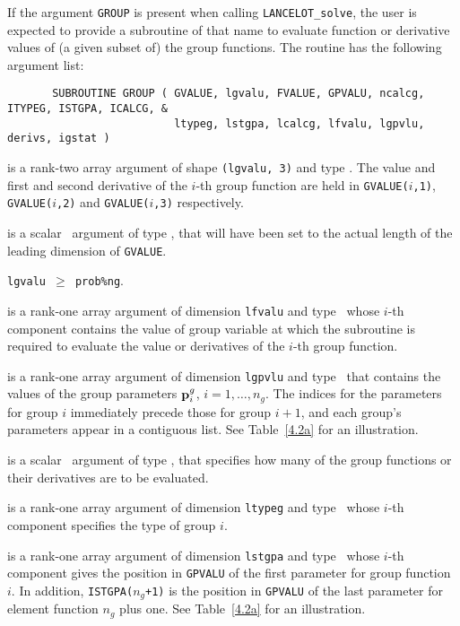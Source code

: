 \documentclass{galahad}
\newcommand{\fullpackagename}{LANC\-E\-LOT}
\newcommand{\solver}{{\tt \fullpackagename\_solve}}
\begin{document}
If the argument {\tt GROUP} is present when calling \solver, the
user is expected to provide a subroutine of that name to evaluate
function or derivative values of (a given subset of) the group functions.
The routine has the following argument list:

\def\baselinestretch{0.8}
{\tt \begin{verbatim}
       SUBROUTINE GROUP ( GVALUE, lgvalu, FVALUE, GPVALU, ncalcg, ITYPEG, ISTGPA, ICALCG, &
                          ltypeg, lstgpa, lcalcg, lfvalu, lgpvlu, derivs, igstat )
\end{verbatim} }
\def\baselinestretch{1.0}

\begin{description}

 is a rank-two \intentout array argument of
shape {\tt (lgvalu, 3)} and type \realdp.
The value and first and second derivative of the $i$-th group
function are held in
{\tt GVALUE($i$,1)},
{\tt GVALUE($i$,2)} and
{\tt GVALUE($i$,3)}
respectively.

 is a scalar \intentin\ argument of type \integer,
that will have been set to the actual length of the leading dimension
of {\tt GVALUE}.

\restriction
{\tt lgvalu $\geq$ prob\%ng}.

 is a rank-one \intentin array argument of
dimension {\tt lfvalu} and type \realdp\,
whose $i$-th component contains the value of group variable at which the
subroutine is required to evaluate the value or derivatives
of the $i$-th group function.

 is a rank-one \intentin array argument of
dimension {\tt lgpvlu}  and type \realdp\,
that contains the values of the group parameters ${\mathbf{p}}^g_i$, $i = 1, \ldots,
n_g$. The indices for the parameters for group $i$ immediately precede
those for group $i+1$, and each group's parameters appear in a contiguous
list. See Table~\ref{4.2a} for an illustration.

 is a scalar \intentin\ argument of type \integer,
that specifies how many of the group functions or their
derivatives are to be evaluated.

 is a rank-one \intentin array argument of
dimension {\tt ltypeg} and type \integer\,
whose $i$-th component specifies the type of group $i$.

 is a rank-one \intentin array argument of
dimension {\tt lstgpa} and type \integer\,
whose $i$-th component gives the position in
{\tt GPVALU} of the first parameter for group function $i$.  In
addition, {\tt ISTGPA($n_g$+1)} is the position in
{\tt GPVALU} of the last  parameter for element function $n_g$ plus one. See
Table~\ref{4.2a} for an illustration.


\end{description}
\end{document}
